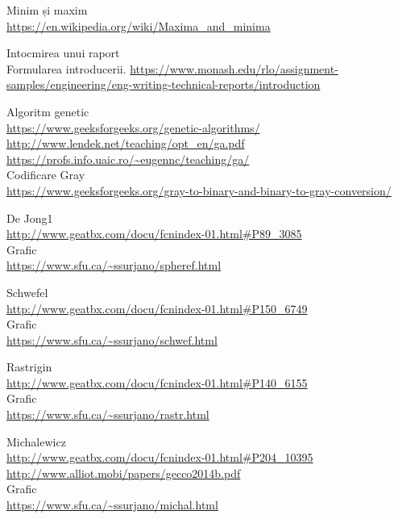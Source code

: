 \documentclass{article}
\begin{document}
\begin{thebibliography}{9}

  Minim și maxim\\
  \url{https://en.wikipedia.org/wiki/Maxima_and_minima}
  
  \begin{flushleft}
  Intocmirea unui raport \\ Formularea introducerii.
  \url{https://www.monash.edu/rlo/assignment-samples/engineering/eng-writing-technical-reports/introduction}
  \end{flushleft}
  Algoritm genetic\\
  \url{https://www.geeksforgeeks.org/genetic-algorithms/}\\
  \url{http://www.lendek.net/teaching/opt_en/ga.pdf}\\
    \url{https://profs.info.uaic.ro/~eugennc/teaching/ga/}\\
  Codificare Gray\\
  \url{https://www.geeksforgeeks.org/gray-to-binary-and-binary-to-gray-conversion/}
  
  De Jong1\\
  \url{http://www.geatbx.com/docu/fcnindex-01.html#P89_3085}\\
  Grafic\\
\url{https://www.sfu.ca/~ssurjano/spheref.html}
  
  Schwefel\\
  \url{http://www.geatbx.com/docu/fcnindex-01.html#P150_6749}\\
    Grafic\\
\url{https://www.sfu.ca/~ssurjano/schwef.html}
  
  Rastrigin\\
  \url{http://www.geatbx.com/docu/fcnindex-01.html#P140_6155}\\
    Grafic\\
\url{https://www.sfu.ca/~ssurjano/rastr.html}
  
  Michalewicz\\
  \url{http://www.geatbx.com/docu/fcnindex-01.html#P204_10395}\\
  \url{http://www.alliot.mobi/papers/gecco2014b.pdf}\\
    Grafic\\
\url{https://www.sfu.ca/~ssurjano/michal.html}
  
  
\end{thebibliography}  
\end{document}
